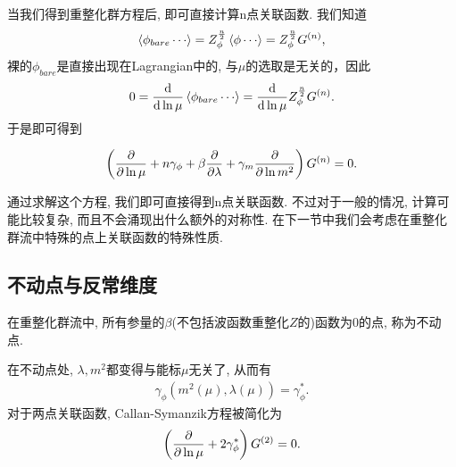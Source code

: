 当我们得到重整化群方程后, 即可直接计算n点关联函数. 我们知道
\begin{align}
    \braket{\phi_{bare}\cdots}=Z_\phi^{\frac n2}\braket{\phi\cdots}=Z_\phi^{\frac n2}G^{(n)},
\end{align}
裸的$\phi_{bare}$是直接出现在Lagrangian中的, 与$\mu$的选取是无关的，因此
\begin{align}
    0=\frac{\mathrm d}{\mathrm d\ln\mu}\braket{\phi_{bare}\cdots}=\frac{\mathrm d}{\mathrm d\ln\mu}Z_\phi^{\frac n2}G^{(n)}.
\end{align}
于是即可得到
\begin{theorem}
    \begin{align}
        \left(\frac{\partial }{\partial \ln\mu}+n\gamma_\phi+\beta\frac{\partial }{\partial \lambda}+\gamma_m\frac{\partial }{\partial \ln m^2}\right)G^{(n)}=0.
    \end{align}
\end{theorem}

通过求解这个方程, 我们即可直接得到n点关联函数. 不过对于一般的情况, 计算可能比较复杂, 而且不会涌现出什么额外的对称性. 在下一节中我们会考虑在重整化群流中特殊的点上关联函数的特殊性质.

\subsection{不动点与反常维度}
\begin{definition}[不动点]
    在重整化群流中, 所有参量的$\beta$(不包括波函数重整化$Z$的)函数为$0$的点, 称为不动点.
\end{definition}

在不动点处, $\lambda, m^2$都变得与能标$\mu$无关了, 从而有
\begin{align}
    \gamma_\phi\left(m^2(\mu),\lambda(\mu)\right)=\gamma_\phi^*.
\end{align}
对于两点关联函数, Callan-Symanzik方程被简化为
\begin{align}
    \left(\frac{\partial }{\partial \ln\mu}+2\gamma_\phi^*\right)G^{(2)}=0.
\end{align}


